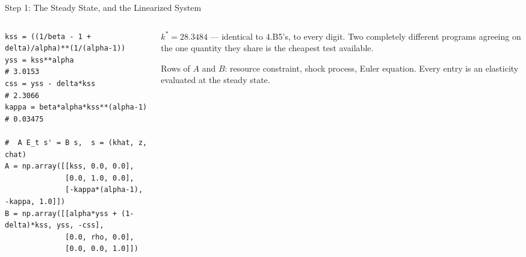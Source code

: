 \begin{frame}[fragile]{Step 1: The Steady State, and the Linearized System}
\begin{columns}[T]
\begin{column}{0.56\textwidth}
\begin{lstlisting}
kss = ((1/beta - 1 + delta)/alpha)**(1/(alpha-1))
yss = kss**alpha                 # 3.0153
css = yss - delta*kss            # 2.3066
kappa = beta*alpha*kss**(alpha-1) # 0.03475

#  A E_t s' = B s,  s = (khat, z, chat)
A = np.array([[kss, 0.0, 0.0],
              [0.0, 1.0, 0.0],
              [-kappa*(alpha-1), -kappa, 1.0]])
B = np.array([[alpha*yss + (1-delta)*kss, yss, -css],
              [0.0, rho, 0.0],
              [0.0, 0.0, 1.0]])
\end{lstlisting}
\end{column}
\begin{column}{0.41\textwidth}
\begin{conceptbox}[title=\textbf{Check it first}]\small
$k^{*}=28.3484$ --- identical to 4.B5's, to every digit. Two completely different programs agreeing on the one quantity they share is the cheapest test available.
\end{conceptbox}
\medskip
\begin{examplebox}\footnotesize
Rows of $A$ and $B$: resource constraint, shock process, Euler equation. Every entry is an elasticity evaluated at the steady state.
\end{examplebox}
\end{column}
\end{columns}
\vspace{1mm}
\end{frame}

